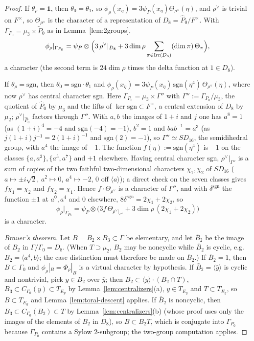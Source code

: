 \documentclass[11pt]{article}
\newcommand{\Irr}{\operatorname{Irr}}
\theoremstyle{plain}
\theoremstyle{definition}
\begin{document}
\begin{proof}
If $\theta_\rho=\mathbf1$, then $\theta_0=\theta_1$, so
$\phi_\rho(x_\eta)=3\psi_P(x_\eta)\Theta_{\rho^\vee}(\eta)$, and
$\rho^\vee$ is trivial on $F^\times$, so $\Theta_{\rho^\vee}$ is the
character of a representation of $D_8=\hat P_0/F^\times$.  With
$\Gamma_{P_0}=\mu_3\times\tilde P_0$ as in Lemma~\ref{lem:2groups},
\[
 \phi_\rho|_{\Gamma_{P_0}}=\psi_P\otimes\Bigl(3\,\rho^\vee|_{D_8}+3\dim\rho\sum_{\pi\in\Irr(D_8)}(\dim\pi)\,\Theta_\pi\Bigr),
\]
a character (the second term is $24\dim\rho$ times the delta function at
$1\in D_8$).

If $\theta_\rho=\mathrm{sgn}$, then $\theta_0=\mathrm{sgn}\cdot\theta_1$ and
$\phi_\rho(x_\eta)=3\psi_P(x_\eta)\,\mathrm{sgn}(\eta^4)\,\Theta_{\rho^\vee}(\eta)$,
where now $\rho^\vee$ has central character $\mathrm{sgn}$.
Here $\Gamma_{P_0}=\mu_3\times\Gamma''$ with $\Gamma'':=\Gamma_{P_0}/\mu_3$,
the quotient of $\hat P_0$ by $\mu_3$ and the lifts of
$\ker\mathrm{sgn}\subset F^\times$, a central extension of $D_8$ by
$\mu_2$; $\rho^\vee|_{\hat P_0}$ factors through $\Gamma''$.  With $a,b$
the images of $1+i$ and $j$ one has $a^8=1$ (as $(1+i)^4=-4$ and
$\mathrm{sgn}(-4)=-1$), $b^2=1$ and $bab^{-1}=a^3$ (as
$j(1+i)j^{-1}=2(1+i)^{-1}$ and $\mathrm{sgn}(2)=-1$), so
$\Gamma''\simeq SD_{16}$, the semidihedral group, with $a^4$ the image of
$-1$.  The function $f(\eta):=\mathrm{sgn}(\eta^4)$ is $-1$ on the classes
$\{a,a^3\},\{a^5,a^7\}$ and $+1$ elsewhere.  Having central character
$\mathrm{sgn}$, $\rho^\vee|_{\Gamma''}$ is a sum of copies of the two
faithful two-dimensional characters $\chi_1,\chi_2$ of $SD_{16}$
($a\mapsto\pm i\sqrt2$, $a^2\mapsto0$, $a^4\mapsto-2$, $0$ off
$\langle a\rangle$); a direct check on the seven classes gives
$f\chi_1=\chi_2$ and $f\chi_2=\chi_1$.  Hence $f\cdot\Theta_{\rho^\vee}$
is a character of $\Gamma''$, and with $\delta^{\mathrm{sgn}}$ the
function $\pm1$ at $a^{0},a^4$ and $0$ elsewhere,
$8\delta^{\mathrm{sgn}}=2\chi_1+2\chi_2$, so
\[
 \phi_\rho|_{\Gamma_{P_0}}=\psi_P\otimes\bigl(3f\,\Theta_{\rho^\vee|_{\Gamma''}}+3\dim\rho\,(2\chi_1+2\chi_2)\bigr)
\]
is a character.

\emph{Brauer's theorem.}  Let $B=B_2\times B_3\subset\Gamma$ be elementary,
and let $\bar B_2$ be the image of $B_2$ in $\Gamma/\Gamma_0=D_8$.  (When
$T\supset\mu_2$, $B_2$ may be noncyclic while $\bar B_2$ is cyclic, e.g.\
$B_2=\langle a^4,b\rangle$; the case distinction must therefore be made
on $\bar B_2$.)  If $\bar B_2=1$, then $B\subset\Gamma_0$ and
$\phi_\rho|_B=\Phi_\rho|_B$ is a virtual character by hypothesis.  If
$\bar B_2=\langle\bar y\rangle$ is cyclic and nontrivial, pick $y\in B_2$
over $\bar y$; then $B_2\subset\langle y\rangle\cdot(B_2\cap T)$, $B_3\subset C_{\Gamma_0}(y)\subset T_{E_y}$
by Lemma~\ref{lem:centralizers}(a), $y\in T_{E_y}$ and $T\subset T_{E_y}$,
so $B\subset T_{E_y}$ and Lemma~\ref{lem:toral-descent} applies.  If
$\bar B_2$ is noncyclic, then $B_3\subset C_{\Gamma_0}(B_2)\subset T$ by
Lemma~\ref{lem:centralizers}(b) (whose proof uses only the images of the
elements of $B_2$ in $D_8$), so $B\subset B_2T$, which is conjugate into
$\Gamma_{P_0}$ because $\Gamma_{P_0}$ contains a Sylow $2$-subgroup; the
two-group computation applies.


\end{proof}
\end{document}
